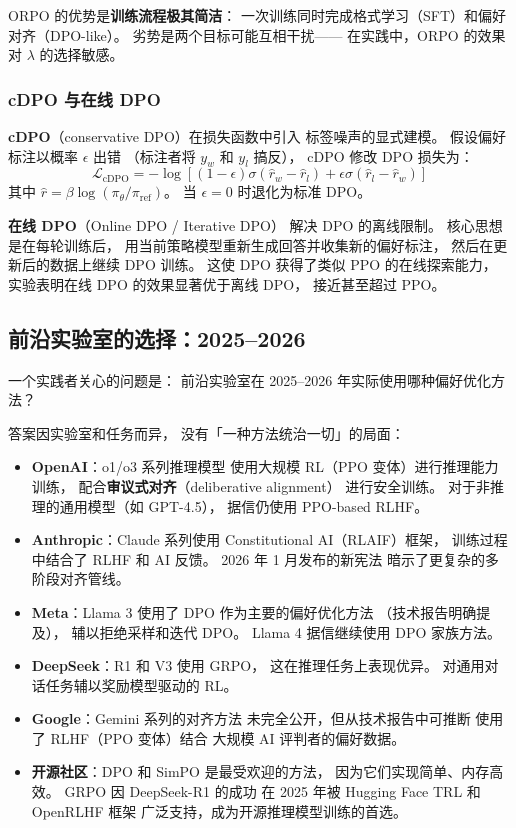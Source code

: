 ORPO 的优势是\textbf{训练流程极其简洁}：
一次训练同时完成格式学习（SFT）和偏好对齐（DPO-like）。
劣势是两个目标可能互相干扰——
在实践中，ORPO 的效果对 $\lambda$ 的选择敏感。

\subsubsection{cDPO 与在线 DPO}

\textbf{cDPO}（conservative DPO）在损失函数中引入
标签噪声的显式建模。
假设偏好标注以概率 $\epsilon$ 出错
（标注者将 $y_w$ 和 $y_l$ 搞反），
cDPO 修改 DPO 损失为：
\begin{equation}
  \mathcal{L}_{\text{cDPO}} = -\log\!\left[
    (1-\epsilon) \sigma(\hat{r}_w - \hat{r}_l)
    + \epsilon \sigma(\hat{r}_l - \hat{r}_w)
  \right]
\end{equation}
其中 $\hat{r} = \beta \log(\pi_\theta / \pi_{\text{ref}})$。
当 $\epsilon = 0$ 时退化为标准 DPO。

\textbf{在线 DPO}（Online DPO / Iterative DPO）
解决 DPO 的离线限制。
核心思想是在每轮训练后，
用当前策略模型重新生成回答并收集新的偏好标注，
然后在更新后的数据上继续 DPO 训练。
这使 DPO 获得了类似 PPO 的在线探索能力，
实验表明在线 DPO 的效果显著优于离线 DPO，
接近甚至超过 PPO。

\subsection{前沿实验室的选择：2025--2026}

一个实践者关心的问题是：
前沿实验室在 2025--2026 年实际使用哪种偏好优化方法？

答案因实验室和任务而异，
没有「一种方法统治一切」的局面：

\begin{itemize}[noitemsep]
  \item \textbf{OpenAI}：o1/o3 系列推理模型
        使用大规模 RL（PPO 变体）进行推理能力训练，
        配合\textbf{审议式对齐}（deliberative alignment）
        进行安全训练。
        对于非推理的通用模型（如 GPT-4.5），
        据信仍使用 PPO-based RLHF。
  \item \textbf{Anthropic}：Claude 系列使用
        Constitutional AI（RLAIF）框架，
        训练过程中结合了 RLHF 和 AI 反馈。
        2026 年 1 月发布的新宪法
        暗示了更复杂的多阶段对齐管线。
  \item \textbf{Meta}：Llama 3 使用了
        DPO 作为主要的偏好优化方法
       （技术报告明确提及），
        辅以拒绝采样和迭代 DPO。
        Llama 4 据信继续使用 DPO 家族方法。
  \item \textbf{DeepSeek}：R1 和 V3 使用 GRPO，
        这在推理任务上表现优异。
        对通用对话任务辅以奖励模型驱动的 RL。
  \item \textbf{Google}：Gemini 系列的对齐方法
        未完全公开，但从技术报告中可推断
        使用了 RLHF（PPO 变体）结合
        大规模 AI 评判者的偏好数据。
  \item \textbf{开源社区}：DPO 和 SimPO 是最受欢迎的方法，
        因为它们实现简单、内存高效。
        GRPO 因 DeepSeek-R1 的成功
        在 2025 年被 Hugging Face TRL 和 OpenRLHF 框架
        广泛支持，成为开源推理模型训练的首选。
\end{itemize}

